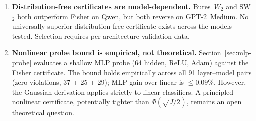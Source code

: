 \documentclass[10pt,twocolumn]{article}
\begin{document}
\begin{enumerate}[leftmargin=*, topsep=2pt, itemsep=2pt]
\item \textbf{Distribution-free certificates are model-dependent.}
  Bures~$W_2$ and SW$_2$ both outperform Fisher on Qwen, but both
  reverse on GPT-2~Medium. No universally superior distribution-free
  certificate exists across the models tested. Selection requires
  per-architecture validation data.

\item \textbf{Nonlinear probe bound is empirical, not theoretical.}
  Section~\ref{sec:mlp-probe} evaluates a shallow MLP probe (64 hidden,
  ReLU, Adam) against the Fisher certificate. The bound holds
  empirically across all 91 layer--model pairs (zero violations, 37 +
  25 + 29); MLP gain over linear is $\leq 0.09\%$. However, the
  Gaussian derivation applies strictly to linear classifiers. A
  principled nonlinear certificate, potentially tighter than
  $\Phi(\sqrt{J/2})$, remains an open theoretical question.


\end{enumerate}
\end{document}

